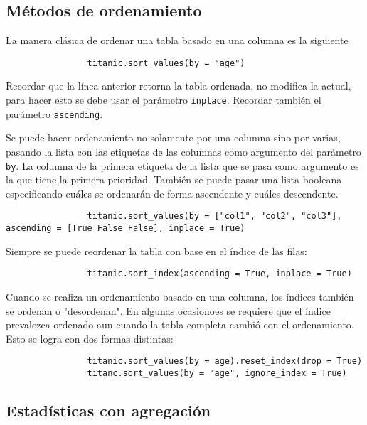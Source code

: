         \subsection{Métodos de ordenamiento}

            \noindent La manera clásica de ordenar una tabla basado en una columna es la siguiente
            \begin{verbatim}
                titanic.sort_values(by = "age")
            \end{verbatim}
            Recordar que la línea anterior retorna la tabla ordenada, no modifica la actual, para hacer esto se debe usar el parámetro \texttt{inplace}. Recordar también el parámetro \texttt{ascending}.

            \noindent Se puede hacer ordenamiento no solamente por una columna sino por varias, pasando la lista con las etiquetas de las columnas como argumento del parámetro \texttt{by}. La columna de la primera etiqueta de la lista que se pasa como argumento es la que tiene la primera prioridad. También se puede pasar una lista booleana especificando cuáles se ordenarán de forma ascendente y cuáles descendente.
            \begin{verbatim}
                titanic.sort_values(by = ["col1", "col2", "col3"], ascending = [True False False], inplace = True)
            \end{verbatim}
            \noindent Siempre se puede reordenar la tabla con base en el índice de las filas:
            \begin{verbatim}
                titanic.sort_index(ascending = True, inplace = True)
            \end{verbatim}
            Cuando se realiza un ordenamiento basado en una columna, los índices también se ordenan o "desordenan". En algunas ocasionoes se requiere que el índice prevalezca ordenado aun cuando la tabla completa cambió con el ordenamiento. Esto se logra con dos formas distintas:
            \begin{verbatim}
                titanic.sort_values(by = age).reset_index(drop = True)
                titanc.sort_values(by = "age", ignore_index = True)
            \end{verbatim}

        \subsection{Estadísticas con agregación}

